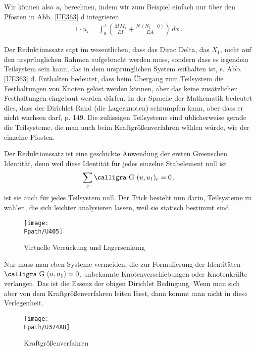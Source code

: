 {{{{{Wir k\"{o}nnen also $u_i$ berechnen, indem wir zum Beispiel einfach nur \"{u}ber den Pfosten in Abb. \ref{UE363} d integrieren
\begin{align}\label{Eq158}
1 \cdot u_i = \int_0^{\,l} (\frac{M\,M_1}{EI} + \frac{N\,(N_1 = 0)}{EA})\,dx\,.
\end{align}


Der Reduktionssatz sagt im wesentlichen, dass das Dirac Delta, das $X_1$, nicht auf den urspr\"{u}nglichen Rahmen aufgebracht werden muss, sondern dass es irgendein { Teilsystem} sein kann, das in dem urspr\"{u}nglichen System \glq enthalten\grq{} ist, s. Abb. \ref{UE363} d. Enthalten bedeutet, dass beim \"{U}bergang zum Teilsystem die Festhaltungen von Knoten gel\"{o}st werden k\"{o}nnen, aber das keine zus\"{a}tzlichen Festhaltungen eingebaut werden d\"{u}rfen. In der Sprache der Mathematik bedeutet dies, dass der { Dirichlet Rand} (die Lagerknoten) schrumpfen kann, aber dass er nicht wachsen darf, \cite{Ha6} p. 149. Die zul\"{a}ssigen Teilsysteme sind \"{u}blicherweise gerade die Teilsysteme, die man auch beim Kraftgr\"{o}{\ss}enverfahren w\"{a}hlen w\"{u}rde, wie der einzelne Pfosten.

Der Reduktionssatz ist eine geschickte Anwendung der ersten Greenschen Identit\"{a}t, denn weil diese Identit\"{a}t f\"{u}r jedes einzelne Stabelement null ist
\begin{align}
\sum_e \text{\normalfont\calligra G\,\,}(u,u_1)_{e} = 0\,,
\end{align}
ist sie auch f\"{u}r jedes Teilsystem null. Der \glq Trick\grq{} besteht nun darin, Teilsysteme zu w\"{a}hlen, die sich leichter analysieren lassen, weil sie statisch bestimmt sind.
\begin{figure}[tbp]
\centering
\if {} \sidecaption[t] \fi
\texttt{[image: \\Fpath/U405]}
\caption{Virtuelle Verr\"{u}ckung und Lagersenkung} \label{U405}
\end{figure}%

Nur muss man eben Systeme vermeiden, die zur Formulierung der Identit\"{a}ten $\text{\normalfont\calligra G\,\,}(u, u_1) = 0$, unbekannte Knotenverschiebungen oder Knotenkr\"{a}fte verlangen. Das ist die Essenz der obigen \glq Dirichlet Bedingung\grq{}. Wenn man sich aber von dem Kraftgr\"{o}{\ss}enverfahren leiten l\"{a}sst, dann kommt man nicht in diese Verlegenheit.
\begin{figure}[tbp]
\centering
\if {} \sidecaption[t] \fi
\texttt{[image: \\Fpath/U374X8]}
\caption{Kraftgr\"{o}{\ss}enverfahren} \label{U374}
\end{figure}%

}}}}}
